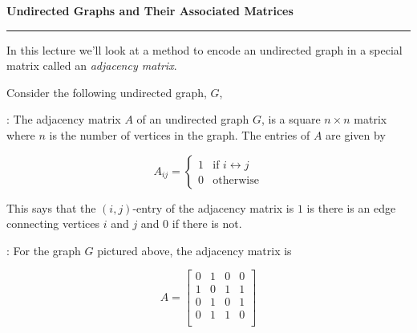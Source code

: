 \documentclass[12pt]{article}
\newcommand{\nin}{\noindent}
\newcommand{\vthree}{\vspace{3mm}}
\newcommand{\mymat}[1]{
\left[
\begin{array}{rrrrrrrrrrrrrrrrrrrrrrrrrrrrrrrrrrrrrrr}
#1
\end{array}
\right]
}
\begin{document}
\clearpage

\nin\Large{\bf Undirected Graphs and Their Associated Matrices}\normalsize
\vspace{4mm}
\hrule

\vthree

\nin In this lecture we'll look at a method to encode an undirected graph in a special matrix called an {\it adjacency matrix}.

\vthree

\nin Consider the following undirected graph, $G$,

\begin{center}
\end{center}

\vthree

\nin {\bf Def}: The adjacency matrix $A$ of an undirected graph $G$, is a square $n \times n$ matrix where $n$ is the number of vertices in the graph.  The entries of $A$ are given by

\[
A_{ij} =
\left\{
\begin{array}{rl}
1 & \textrm{if } i \leftrightarrow j \\
0 & \textrm{otherwise}
\end{array}
\right.
\]

\vthree

\nin This says that the $(i,j)$-entry of the adjacency matrix is $1$ is there is an edge connecting vertices $i$ and $j$ and $0$ if there is not.

\vthree

\nin {\bf Example 1}:  For the graph $G$ pictured above, the adjacency matrix is

\[
A =
\mymat{
0 & 1 & 0 & 0 \\
1 & 0 & 1 & 1 \\
0 & 1 & 0 & 1 \\
0 & 1 & 1 & 0 \\
}
\]

\vthree
\end{document}
